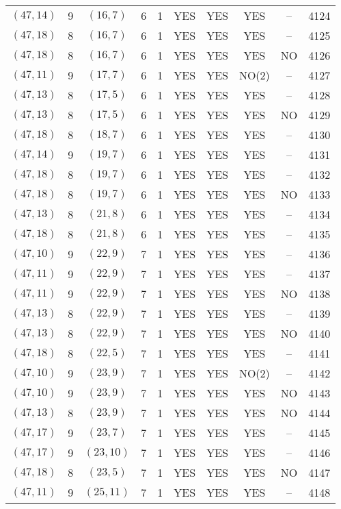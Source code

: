 \begin{longtable}{|c|c|c|c|c|c|c|c|c|c|}
$(47, 14)$ & 9 & $(16, 7)$ & 6 & 1 & YES & YES & YES & -- & 4124\\
$(47, 18)$ & 8 & $(16, 7)$ & 6 & 1 & YES & YES & YES & -- & 4125\\
$(47, 18)$ & 8 & $(16, 7)$ & 6 & 1 & YES & YES & YES & NO & 4126\\
$(47, 11)$ & 9 & $(17, 7)$ & 6 & 1 & YES & YES & NO(2) & -- & 4127\\
$(47, 13)$ & 8 & $(17, 5)$ & 6 & 1 & YES & YES & YES & -- & 4128\\
$(47, 13)$ & 8 & $(17, 5)$ & 6 & 1 & YES & YES & YES & NO & 4129\\
$(47, 18)$ & 8 & $(18, 7)$ & 6 & 1 & YES & YES & YES & -- & 4130\\
$(47, 14)$ & 9 & $(19, 7)$ & 6 & 1 & YES & YES & YES & -- & 4131\\
$(47, 18)$ & 8 & $(19, 7)$ & 6 & 1 & YES & YES & YES & -- & 4132\\
$(47, 18)$ & 8 & $(19, 7)$ & 6 & 1 & YES & YES & YES & NO & 4133\\
$(47, 13)$ & 8 & $(21, 8)$ & 6 & 1 & YES & YES & YES & -- & 4134\\
$(47, 18)$ & 8 & $(21, 8)$ & 6 & 1 & YES & YES & YES & -- & 4135\\
$(47, 10)$ & 9 & $(22, 9)$ & 7 & 1 & YES & YES & YES & -- & 4136\\
$(47, 11)$ & 9 & $(22, 9)$ & 7 & 1 & YES & YES & YES & -- & 4137\\
$(47, 11)$ & 9 & $(22, 9)$ & 7 & 1 & YES & YES & YES & NO & 4138\\
$(47, 13)$ & 8 & $(22, 9)$ & 7 & 1 & YES & YES & YES & -- & 4139\\
$(47, 13)$ & 8 & $(22, 9)$ & 7 & 1 & YES & YES & YES & NO & 4140\\
$(47, 18)$ & 8 & $(22, 5)$ & 7 & 1 & YES & YES & YES & -- & 4141\\
$(47, 10)$ & 9 & $(23, 9)$ & 7 & 1 & YES & YES & NO(2) & -- & 4142\\
$(47, 10)$ & 9 & $(23, 9)$ & 7 & 1 & YES & YES & YES & NO & 4143\\
$(47, 13)$ & 8 & $(23, 9)$ & 7 & 1 & YES & YES & YES & NO & 4144\\
$(47, 17)$ & 9 & $(23, 7)$ & 7 & 1 & YES & YES & YES & -- & 4145\\
$(47, 17)$ & 9 & $(23, 10)$ & 7 & 1 & YES & YES & YES & -- & 4146\\
$(47, 18)$ & 8 & $(23, 5)$ & 7 & 1 & YES & YES & YES & NO & 4147\\
$(47, 11)$ & 9 & $(25, 11)$ & 7 & 1 & YES & YES & YES & -- & 4148\\

\end{longtable}
